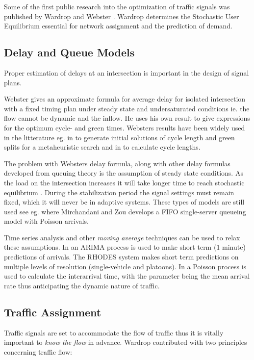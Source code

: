 \label{history}
Some of the first public research into the optimization of traffic signals was published by Wardrop \cite{Wardrop} and Webster \cite{Webster}. Wardrop determines the Stochastic User Equilibrium essential for network assignment and the prediction of demand. 

\subsection{Delay and Queue Models}
Proper estimation of delays at an intersection is important in the design of signal plans.

Webster gives an approximate formula for average delay for isolated intersection with a fixed timing plan under steady state and undersaturated conditions ie. the flow cannot be dynamic and the inflow. 
He uses his own result to give expressions for the optimum cycle- and green times. 
Websters results have been widely used in the litterature eg. in \cite{1} to generate initial solutions of cycle length and green splits for a metaheuristic search and in \cite{30} to calculate cycle lengths.

The problem with Websters delay formula, along with other delay formulas developed from queuing theory is the assumption of steady state conditions. As the load on the intersection increases it will take longer time to reach stochastic equilibrium \cite{traffictheory}. During the stabilization period the signal settings must remain fixed, which it will never be in adaptive systems. These types of models are still used see eg. \cite{38} where Mirchandani and Zou develops a FIFO single-server queueing model with Poisson arrivals.

Time series analysis and other \textit{moving average} techniques can be used to relax these assumptions. In \cite{shortpredict} an ARIMA process is used to make short term (1 minute) predictions of arrivals. The RHODES system \cite{44} makes short term predictions on multiple levels of resolution (single-vehicle and platoons). In \cite{1}                                                                                          a Poisson process is used to calculate the interarrival time, with the parameter being the mean arrival rate thus anticipating the dynamic nature of traffic.

\subsection{Traffic Assignment}
\label{usereq}
Traffic signals are set to accommodate the flow of traffic thus it is vitally important to \textit{know the flow} in advance. Wardrop contributed with two principles concerning traffic flow:

